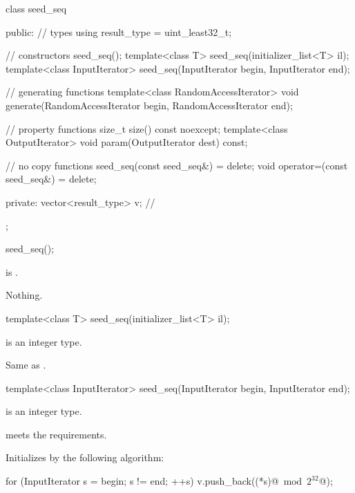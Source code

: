 %
%
\begin{codeblock}
class seed_seq {
public:
  // types
  using result_type = uint_least32_t;

  // constructors
  seed_seq();
  template<class T>
    seed_seq(initializer_list<T> il);
  template<class InputIterator>
    seed_seq(InputIterator begin, InputIterator end);

  // generating functions
  template<class RandomAccessIterator>
    void generate(RandomAccessIterator begin, RandomAccessIterator end);

  // property functions
  size_t size() const noexcept;
  template<class OutputIterator>
    void param(OutputIterator dest) const;

  // no copy functions
  seed_seq(const seed_seq&) = delete;
  void operator=(const seed_seq&) = delete;

private:
  vector<result_type> v;        // \expos
};
\end{codeblock}


%
\begin{itemdecl}
seed_seq();
\end{itemdecl}

\begin{itemdescr}
\pnum
\ensures
{} is .

\pnum
\throws
Nothing.
\end{itemdescr}


%
\begin{itemdecl}
template<class T>
 seed_seq(initializer_list<T> il);
\end{itemdecl}

\begin{itemdescr}
\pnum
\mandates
{} is an integer type.

\pnum
\effects
 Same as .
\end{itemdescr}


%
\begin{itemdecl}
template<class InputIterator>
  seed_seq(InputIterator begin, InputIterator end);
\end{itemdecl}

\begin{itemdescr}
\pnum
\mandates
  is an integer type.

\pnum
\expects
   meets the
   requirements.

\pnum
\effects
Initializes 
by the following algorithm:
\begin{codeblock}
for (InputIterator s = begin; s != end; ++s)
 v.push_back((*s)@$\bmod 2^{32}$@);
\end{codeblock}%
\end{itemdescr}

